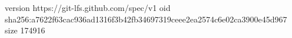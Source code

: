 version https://git-lfs.github.com/spec/v1
oid sha256:a7622f63cac936ad1316f3b42fb34697319ceee2ea2574c6e02ca3900e45d967
size 174916
